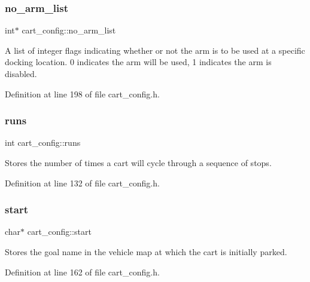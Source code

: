 \subsubsection{\texorpdfstring{no\+\_\+arm\+\_\+list}{no\_arm\_list}}
{\footnotesize\ttfamily int$\ast$ cart\+\_\+config\+::no\+\_\+arm\+\_\+list\hspace{0.3cm}{\ttfamily [private]}}

A list of integer flags indicating whether or not the arm is to be used at a specific docking location. 0 indicates the arm will be used, 1 indicates the arm is disabled. 

Definition at line 198 of file cart\+\_\+config.\+h.

\mbox{\label{classcart__config_a7ad70584604bd971e639efb74a1552ec}} 
\subsubsection{\texorpdfstring{runs}{runs}}
{\footnotesize\ttfamily int cart\+\_\+config\+::runs\hspace{0.3cm}{\ttfamily [private]}}

Stores the number of times a cart will cycle through a sequence of stops. 

Definition at line 132 of file cart\+\_\+config.\+h.

\mbox{\label{classcart__config_a353c41c44acad0ec6620f92d01942e7f}} 
\subsubsection{\texorpdfstring{start}{start}}
{\footnotesize\ttfamily char$\ast$ cart\+\_\+config\+::start\hspace{0.3cm}{\ttfamily [private]}}

Stores the goal name in the vehicle map at which the cart is initially parked. 

Definition at line 162 of file cart\+\_\+config.\+h.

\mbox{\label{classcart__config_a4bafa2b778c01f3648df8f24b24e59bb}} 
